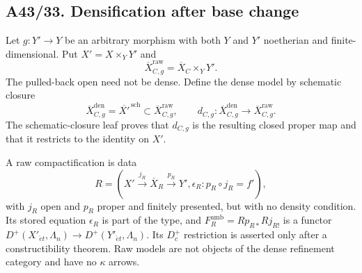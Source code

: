 \subsection*{A43/33. Densification after base change}

Let $g:Y'\to Y$ be an arbitrary morphism with both $Y$ and $Y'$ noetherian
and finite-dimensional.  Put $X'=X\times_Y Y'$ and
\[
 \overline X_{C,g}^{\mathrm{raw}}=\overline X_C\times_Y Y'.
\]
The pulled-back open need not be dense.  Define the dense model by schematic
closure
\[
 \overline X_{C,g}^{\mathrm{den}}
 =\overline{X'}^{\,\mathrm{sch}}
 \subset\overline X_{C,g}^{\mathrm{raw}},
 \qquad
 d_{C,g}:\overline X_{C,g}^{\mathrm{den}}
       \longrightarrow\overline X_{C,g}^{\mathrm{raw}}.
\tag{BA43-DEN}
\]
The schematic-closure leaf proves that $d_{C,g}$ is the resulting closed
proper map and that it restricts to the identity on $X'$.


A raw compactification is data
\[
 R=(X'\xrightarrow{j_R}\overline X_R\xrightarrow{p_R}Y',
       \epsilon_R:p_R\circ j_R=f'),
\tag{BA43-RAW-DATA}
\]
with $j_R$ open and $p_R$ proper and finitely presented, but with no density
condition.  Its stored equation $\epsilon_R$ is part of the type, and
$F_R^{\mathrm{amb}}=Rp_{R*}Rj_{R!}$ is a functor
$D^+(X'_{\acute et},\Lambda_n)\to D^+(Y'_{\acute et},\Lambda_n)$.
Its $D_c^+$ restriction is asserted only after a constructibility theorem.
Raw models are not objects of the dense
refinement category and have no $\kappa$ arrows.

